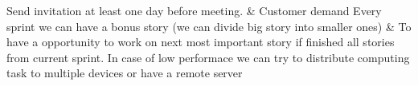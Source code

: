 \nextItem Send invitation at least one day before meeting. & Customer demand
\nextItem Every sprint we can have a bonus story (we can divide big story into smaller ones) & To have a opportunity to work on next most important story if finished all stories from current sprint.
\nextItem In case of low performace we can try to distribute computing task to multiple devices or have a remote server
